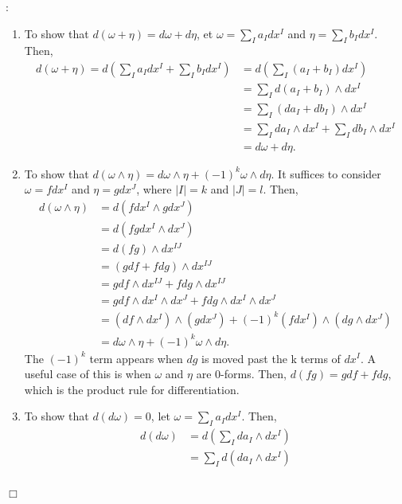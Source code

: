 \documentclass{article}
\def\endproofmark{$\Box$}
\newenvironment{proof}{\par\noindent{\bf Proof}:}{\endproofmark\smallskip}
\begin{document}
\begin{proof}
    \begin{enumerate}
        \item To show that $d(\omega + \eta) = d\omega + d\eta$, et $\omega = \sum_{I} a_I dx^I$ and $\eta = \sum_{I} b_I dx^I$. Then,
        \begin{align*}
            d(\omega + \eta) = d\left( \sum_{I} a_I dx^I + \sum_{I} b_I dx^I \right) &= d\left( \sum_{I} (a_I + b_I) dx^I \right) \\
            &= \sum_{I} d(a_I + b_I) \wedge dx^I \\
            &= \sum_{I} (da_I + db_I) \wedge dx^I \\
            &= \sum_{I} da_I \wedge dx^I + \sum_{I} db_I \wedge dx^I \\
            &= d\omega + d\eta.
        \end{align*}
        \item To show that $d(\omega \wedge \eta) = d\omega \wedge \eta + (-1)^k \omega \wedge d\eta$. It suffices to consider $\omega = f dx^I$ and $\eta = g dx^J$, where $|I| = k$ and $|J| = l$. Then,
        \begin{align*}
            d(\omega \wedge \eta) &= d(f dx^I \wedge g dx^J) \\
            &= d(fg dx^I \wedge dx^J) \\
            &= d(fg) \wedge dx^{IJ}\\
            &= (g df + f dg) \wedge dx^{IJ}\\
            &= g df \wedge dx^{IJ} + f dg \wedge dx^{IJ}\\
            &= g df \wedge dx^I \wedge dx^J + f dg \wedge dx^I \wedge dx^J\\
            &= (df\wedge dx^I) \wedge (g dx^J) + (-1)^k (f dx^I) \wedge (dg\wedge dx^J)\\
            &= d\omega \wedge \eta + (-1)^k \omega \wedge d\eta.
        \end{align*}
        The $(-1)^k$ term appears when $dg$ is moved past the k terms of $dx^I$.
        A useful case of this is when $\omega$ and $\eta$ are 0-forms. Then, $d(fg) = g df + f dg$, which is the product rule for differentiation.
        \item To show that $d(d\omega) =  0$, let $\omega = \sum_{I} a_I dx^I$. Then,
        \begin{align*}
            d(d\omega) &= d\left( \sum_{I} da_I \wedge dx^I \right) \\
            &= \sum_{I} d(da_I \wedge dx^I) \\

\end{align*}
\end{enumerate}
\end{proof}
\end{document}
